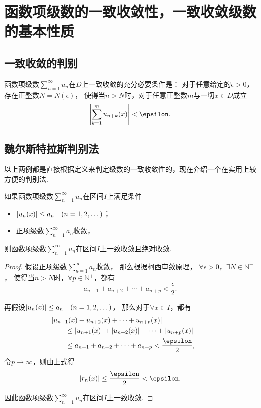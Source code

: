 \section{函数项级数的一致收敛性，一致收敛级数的基本性质}

\subsection{一致收敛的判别}
\begin{theorem}
函数项级数\(\sum_{n=1}^\infty u_n\)在\(D\)上一致收敛的充分必要条件是：
对于任意给定的\(\epsilon>0\)，存在正整数\(N = N(\epsilon)\)，
使得当\(n>N\)时，对于任意正整数\(m\)与一切\(x \in D\)成立
\[
	\abs{\sum_{k=1}^m u_{n+k}(x)} < \epsilon.
\]
\end{theorem}

\subsection{魏尔斯特拉斯判别法}
以上两例都是直接根据定义来判定级数的一致收敛性的，现在介绍一个在实用上较方便的判别法.
\begin{theorem}[魏尔斯特拉斯判别法]\label{theorem:无穷级数.魏尔斯特拉斯判别法}
如果函数项级数\(\sum_{n=1}^\infty u_n\)在区间\(I\)上满足条件\begin{itemize}
	\item \(\abs{u_n(x)} \leq a_n \quad(n=1,2,\dotsc)\)；
	\item 正项级数\(\sum_{n=1}^\infty a_n\)收敛，
\end{itemize}
则函数项级数\(\sum_{n=1}^\infty u_n\)在区间\(I\)上一致收敛且绝对收敛.
\begin{proof}
假设正项级数\(\sum_{n=1}^\infty a_n\)收敛，
那么根据\hyperref[theorem:无穷级数.级数的柯西审敛原理]{柯西审敛原理}，
\(\forall\epsilon>0\)，\(\exists N \in \mathbb{N}^+\)，
使得当\(n > N\)时，\(\forall p \in \mathbb{N}^+\)，都有\[
	a_{n+1} + a_{n+2} + \dotsb + a_{n+p} < \frac{\epsilon}{2}.
\]

再假设\(\abs{u_n(x)} \leq a_n \quad(n=1,2,\dotsc)\)，
那么对于\(\forall x \in I\)，都有\begin{align*}
	&\hspace{-20pt}\abs{u_{n+1}(x) + u_{n+2}(x) + \dotsb + u_{n+p}(x)} \\
	&\leq \abs{u_{n+1}(x)} + \abs{u_{n+2}(x)} + \dotsb + \abs{u_{n+p}(x)} \\
	&\leq a_{n+1} + a_{n+2} + \dotsb + a_{n+p} < \frac{\epsilon}{2},
\end{align*}
令\(p\to\infty\)，则由上式得\[
	\abs{r_n(x)} \leq \frac{\epsilon}{2} < \epsilon.
\]

因此函数项级数\(\sum_{n=1}^\infty u_n\)在区间\(I\)上一致收敛.
\end{proof}
\end{theorem}

